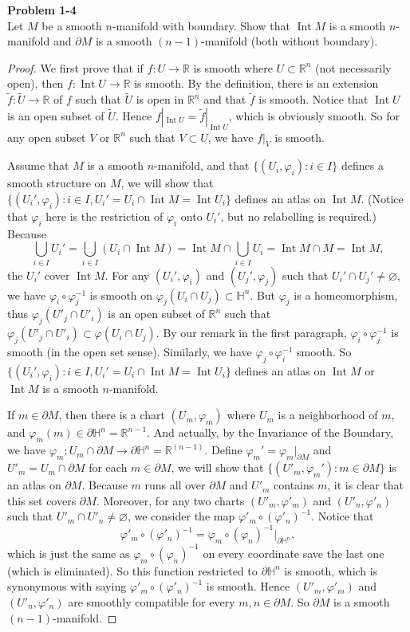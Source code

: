 \documentclass[12pt, a4paper]{article}
\theoremstyle{plain}
\newcommand{\R}{\mathbb{R}}
\newcommand{\set}[1]{\mathbb{#1}}
\def\phi{\varphi}
\DeclareMathOperator{\Int}{Int}
\def\tilde{\widetilde}
\newenvironment{problem}[2][Problem]
    { \begin{mdframed}[backgroundcolor=gray!20] \textbf{#1 #2} \\}
    {  \end{mdframed}}
\begin{document}
\begin{problem}{1-4}
    Let $M$ be a smooth $n$-manifold with boundary. Show that $\Int M$ is a smooth $n$-manifold and $\partial M$ is a smooth $(n-1)$-manifold (both without boundary).
\end{problem}
    \begin{proof}
        We first prove that if $f\colon U\to \R$ is smooth where $U\subset \R^n$ (not necessarily open), then $f\colon \Int U\to \R$ is smooth. By the definition, there is an extension $\tilde f\colon\tilde U\to \R$ of $f$ such that $\tilde U$ is open in $\R^n$ and that $\tilde f$ is smooth. Notice that $\Int U$ is an open subset of $\tilde U$. Hence $f|_{\Int U}=\tilde f|_{\Int U}$, which is obviously smooth. So for any open subset $V$ or $\R^n$ such that $V\subset U$, we have $f|_V$ is smooth.

        Assume that $M$ is a smooth $n$-manifold, and that $\{(U_i,\phi_i):i\in I\}$ defines a smooth structure on $M$, we will show that $\{(U_i',\phi_i):i\in I, U_i'=U_i\cap\Int M=\Int U_i\}$ defines an atlas on $\Int M$. (Notice that $\phi_i$ here is the restriction of $\phi_i$ onto $U_i'$, but no relabelling is required.) Because
        \[
        \bigcup_{i\in I}U_i'=\bigcup_{i\in I}(U_i\cap \Int M)=\Int M\cap \bigcup_{i\in I}U_i = \Int M\cap M = \Int M,
        \]
        the $U_i'$ cover $\Int M$. For any $(U_i',\phi_i)$ and $(U_j',\phi_j)$ such that $U_i'\cap U_j'\neq \varnothing$, we have $\phi_i\circ\phi_j^{-1}$ is smooth on $\phi_j(U_i\cap U_j)\subset \set{H}^n$. But $\phi_j$ is a homeomorphism, thus $\phi_j(U'_j\cap U'_i)$ is an open subset of $\R^n$ such that $\phi_j(U'_j\cap U'_i)\subset \phi(U_i\cap U_j)$. By our remark in the first paragraph, $\phi_i\circ \phi_j^{-1}$ is smooth (in the open set  sense). Similarly, we have $\phi_j\circ \phi_i^{-1}$ smooth. So $\{(U_i',\phi_i):i\in I, U_i'=U_i\cap\Int M=\Int U_i\}$ defines an atlas on $\Int M$ or $\Int M$ is a smooth $n$-manifold.

        If $m\in \partial M$, then there is a chart $(U_m,\phi_m)$ where $U_m$ is a neighborhood of $m$, and $\phi_m(m)\in \partial \set{H}^n=\R^{n-1}$. And actually, by the Invariance of the Boundary, we have $\phi_m\colon U_m\cap \partial M\to \partial \set{H}^n=\R^{(n-1)}$.
        Define $\phi_m'={\phi_m}|_{\partial M}$ and $U'_m=U_m\cap\partial M$ for each $m\in\partial M$, we will show that $\{(U'_m,\phi_m'):m\in\partial M\}$ is an atlas on $\partial M$. Because $m$ runs all over $\partial M$ and $U'_m$ contains $m$, it is clear that this set covers $\partial M$. Moreover, for any two charts $(U'_m,\phi'_m)$ and $(U'_n,\phi'_n)$ such that $U'_m\cap U'_n\neq \varnothing$, we consider the map $\phi'_m\circ (\phi'_n)^{-1}$. Notice that
        \[
        \phi'_m\circ (\phi'_n)^{-1}=\phi_m\circ (\phi_n)^{-1}|_{\partial \set{H}^n},
        \]
        which is just the same as $\phi_m\circ (\phi_n)^{-1}$ on every coordinate save the last one (which is eliminated). So this function restricted to $\partial\set{H}^n$ is smooth, which is synonymous with saying $\phi'_m\circ (\phi'_n)^{-1}$ is smooth. Hence $(U'_m,\phi'_m)$ and $(U'_n,\phi'_n)$ are smoothly compatible for every $m,n\in\partial M$. So $\partial M$ is a smooth $(n-1)$-manifold.
    \end{proof}
\end{document}
